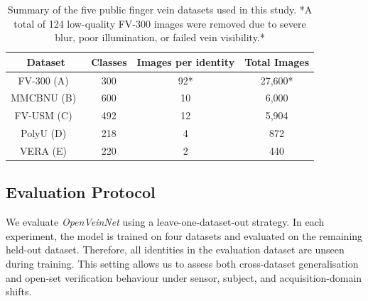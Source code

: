 \documentclass[10pt,journal,compsoc]{IEEEtran}
\begin{document}
\begin{table}[hbt!]
    \centering
    \begin{tabular}{|c|c|c|c|}
         \hline
         Dataset & Classes & Images per identity & Total Images \\
         \hline
         \hline
         FV-300 (A)~\cite{veinatnnet} & 300 & 92* & 27,600* \\
         \hline
         MMCBNU (B)~\cite{mmcbnu} & 600 & 10 & 6,000 \\
         \hline
         FV-USM (C)~\cite{fvusm} & 492 & 12 & 5,904 \\
         \hline
         PolyU (D)~\cite{polyu} & 218 & 4 & 872 \\
         \hline
         VERA (E)~\cite{vera} & 220 & 2 & 440 \\
         \hline
    \end{tabular}
    \medskip
    \caption{Summary of the five public finger vein datasets used in this study. *A total of 124 low-quality FV-300 images were removed due to severe blur, poor illumination, or failed vein visibility.*}
    \label{tab:datasets}
\end{table}



\subsection{Evaluation Protocol}
\label{sec:evaluation_protocol}

We evaluate \textit{OpenVeinNet} using a leave-one-dataset-out strategy. In each experiment, the model is trained on four datasets and evaluated on the remaining held-out dataset. Therefore, all identities in the evaluation dataset are unseen during training. This setting allows us to assess both cross-dataset generalisation and open-set verification behaviour under sensor, subject, and acquisition-domain shifts.
\end{document}
